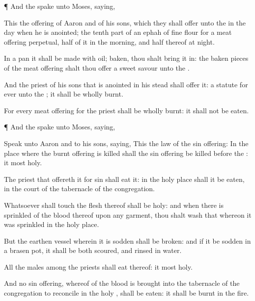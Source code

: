 {\par }{\PP {}¶ And the
{}
spake unto
Moses,
saying,

This
{} the
offering of
Aaron and of his
sons, which they shall
offer unto the
{} in the
day when he is
anointed; the tenth
part of an
ephah of fine
flour for a meat
offering
perpetual,
half of it in the
morning, and
half thereof at
night.

In a
pan it shall be
made with
oil;
{}
baken, thou shalt
bring it in:
{} the
baken
pieces of the meat
offering shalt thou
offer
{} a
sweet
savour unto the
{}.

And the
priest of his
sons that is
anointed in his stead shall
offer it:
{} a
statute for
ever unto the
{}; it shall be
wholly
burnt.

For every meat
offering for the
priest shall be wholly
burnt: it shall not be
eaten.


\par }{\PP {}¶ And the
{}
spake unto
Moses,
saying,

Speak unto
Aaron and to his
sons,
saying, This
{} the
law of the sin
offering: In the
place where the burnt
offering is
killed shall the sin
offering be
killed
before the
{}: it
{}
most
holy.

The
priest that offereth it for
sin shall
eat it: in the
holy
place shall it be
eaten, in the
court of the
tabernacle of the
congregation.

Whatsoever shall
touch the
flesh thereof shall be
holy: and when there is
sprinkled of the
blood thereof upon any
garment, thou shalt
wash that whereon it was
sprinkled in the
holy
place.

But the
earthen
vessel wherein it is
sodden shall be
broken: and if it be
sodden in a
brasen
pot, it shall be both
scoured, and
rinsed in
water.

All the
males among the
priests shall
eat thereof: it
{}
most
holy.

And no sin
offering, whereof
{} of the
blood is
brought into the
tabernacle of the
congregation to
reconcile
{} in the
holy
{}, shall be
eaten: it shall be
burnt in the
fire.




\par }
